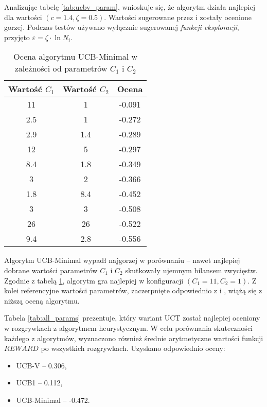 \documentclass[a4paper,12pt]{article}
\begin{document}
Analizując tabelę \ref{tab:ucbv_param}, wnioskuje się, że algorytm działa najlepiej dla wartości $(c=1.4, \zeta=0.5)$. Wartości sugerowane przez \cite{tron} i \cite{ucbv} zostały ocenione gorzej. Podczas testów używano wyłącznie sugerowanej \textit{funkcji eksploracji}, przyjęto $\varepsilon=\zeta \cdot \ln N_i$.\\

\begin{table}[!h]
	\centering
	\begin{tabular}{|c|c|c|} \hline
		Wartość $C_1$ & Wartość $C_2$ & Ocena \\ \hline
		11 & 1 & 	-0.091 \\ \hline
		\rowcolor{teal} 2.5 & 1 & 	-0.272 \\ \hline
		2.9 & 1.4 & 	-0.289 \\ \hline
		12 & 5 & 	-0.297 \\ \hline
		\rowcolor{yellow} 8.4 & 1.8 & 	-0.349 \\ \hline
		3 & 2 & 	-0.366 \\ \hline
		1.8 & 8.4 & 	-0.452 \\ \hline
		3 & 3 & 	-0.508 \\ \hline
		26 & 26 & 	-0.522 \\ \hline
		9.4 & 2.8 & 	-0.556 \\ \hline
	\end{tabular}
	\caption{Ocena algorytmu UCB-Minimal w zależności od parametrów $C_1$ i $C_2$}
	\label{tab:ucbm_param}
\end{table}

Algorytm UCB-Minimal wypadł najgorzej w porównaniu -- nawet najlepiej dobrane wartości parametrów $C_1$ i $C_2$ skutkowały ujemnym bilansem zwycięstw. Zgodnie z tabelą \ref{tab:ucbm_param}, algorytm gra najlepiej w konfiguracji $(C_1 = 11, C_2 = 1)$. Z kolei referencyjne wartości parametrów, zaczerpnięte odpowiednio z \cite{ucbminimal} i \cite{tron}, wiążą się z niższą oceną algorytmu.

\clearpage

Tabela \ref{tab:all_params} prezentuje, który wariant UCT został najlepiej oceniony w rozgrywkach z algorytmem heurystycznym. W celu porównania skuteczności każdego z algorytmów, wyznaczono również średnie arytmetyczne wartości funkcji $REWARD$ po wszystkich rozgrywkach. Uzyskano odpowiednio oceny:

\begin{itemize}
	\item UCB-V -- 0.306,
	\item UCB1 -- 0.112,
	\item UCB-Minimal -- -0.472.
\end{itemize}
\end{document}

